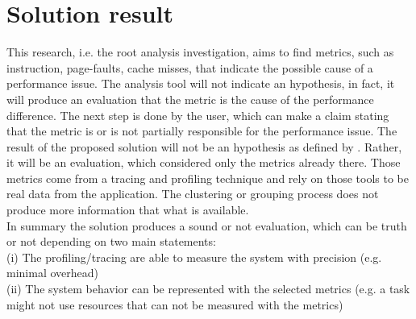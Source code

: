 \section{Solution result}  %
This research, i.e. the root analysis investigation, aims to find metrics, such as instruction, page-faults, cache misses, that indicate the possible cause of a performance issue. The analysis tool will not indicate an hypothesis, in fact, it will produce an evaluation that the metric is the cause of the performance difference. The next step is done by the user, which can make a claim stating that the metric is or is not partially responsible for the performance issue. 
The result of the proposed solution will not be an hypothesis as defined by \cite{Blackburn2016TWT29822142983574}. Rather, it will be an evaluation, which considered only the metrics already there. Those metrics come from a tracing and profiling technique and rely on those tools to be real data from the application. The clustering or grouping process does not produce more information that what is available.\\
In summary the solution produces a sound or not evaluation, which can be truth or not depending on two main statements:\\
(i) The profiling/tracing are able to measure the system with precision (e.g. minimal overhead)\\
(ii) The system behavior can be represented with the selected metrics (e.g. a task might not use resources that can not be measured with the metrics)

